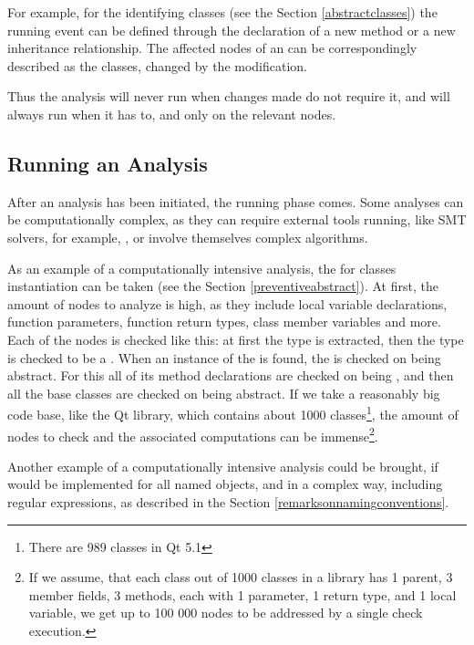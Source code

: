 For example, for the  identifying  classes (see the Section \ref{abstractclasses}) the running
event can be defined through the declaration of a new method or a new inheritance relationship. The 
affected nodes of an  can be correspondingly described as the classes, changed by the modification.

Thus the analysis will never run when changes made do not require it, and will always run when 
it has to, and only on the relevant nodes.


\subsection{Running an Analysis}

After an analysis has been initiated, the running phase comes. Some analyses can be computationally complex,
as they can require external tools running, like SMT solvers, for example, \cite{2012_ratiu_modular_dsls_and_analyses},
or involve themselves complex algorithms.


As an example of a computationally intensive analysis, the  for  classes 
instantiation can be taken (see the Section \ref{preventiveabstract}). At first, the amount of nodes to analyze is high,
as they include local variable declarations, function parameters, function return types, class member variables
and more. Each of the nodes is checked like this: at first the type is extracted, then the type is checked to be 
a . When an instance of the  is found, the  is checked on being abstract.
For this all of its method declarations are checked on being , and then all the base classes are 
checked on being abstract. If we take a reasonably big code base, like  the Qt library, which contains about 1000
classes\footnote{There are 989 classes in Qt 5.1}, the amount of nodes to check and the associated computations can be immense\footnote{If we assume,
that each class out of 1000 classes in a library has 1 parent, 3 member fields, 3 methods, each with 1 parameter, 1 return type, and 1 local variable,
we get up to 100 000 nodes to be addressed by a single check execution.}.

Another example of a computationally intensive analysis could be brought, if   would
be implemented for all named objects, and in a complex way, including regular expressions, as described in the Section \ref{remarksonnamingconventions}.

